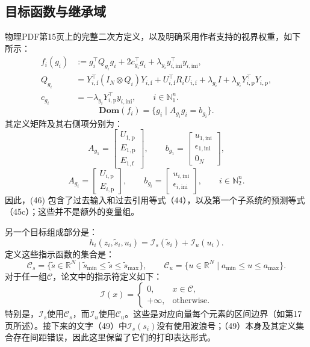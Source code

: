 \documentclass{article}
\begin{document}
\subsection*{目标函数与继承域}
物理PDF第15页上的完整二次方定义，以及明确采用作者支持的视界权重，如下所示：
\begin{align*}
f_i(g_i)&:=g_i^\top Q_{g_i}g_i+2c_{g_i}^\top g_i
 +\lambda_{y_i}y_{i,\mathrm{ini}}^\top y_{i,\mathrm{ini}},\\
Q_{g_i}&=Y_{i,\mathrm f}^\top(I_N\otimes Q_i)Y_{i,\mathrm f}
 +U_{i,\mathrm f}^\top R_iU_{i,\mathrm f}
 +\lambda_{g_i}I+\lambda_{y_i}Y_{i,\mathrm p}^\top Y_{i,\mathrm p},\\
c_{g_i}&=-\lambda_{y_i}Y_{i,\mathrm p}^\top y_{i,\mathrm{ini}},
\qquad i\in\mathbb N_1^n.
\end{align*}
\begin{equation}
\mathbf{Dom}(f_i)=\{g_i\mid A_{g_i}g_i=b_{g_i}\}. \tag{46}
\end{equation}
其定义矩阵及其右侧项分别为：
\[
A_{g_1}=\begin{bmatrix}U_{1,\mathrm p}\\E_{1,\mathrm p}\\E_{1,\mathrm f}\end{bmatrix},
\qquad
b_{g_1}=\begin{bmatrix}u_{1,\mathrm{ini}}\\\epsilon_{1,\mathrm{ini}}\\0_N\end{bmatrix},
\]
\[
A_{g_i}=\begin{bmatrix}U_{i,\mathrm p}\\E_{i,\mathrm p}\end{bmatrix},
\qquad
b_{g_i}=\begin{bmatrix}u_{i,\mathrm{ini}}\\\epsilon_{i,\mathrm{ini}}\end{bmatrix},
\qquad i\in\mathbb N_2^n.
\]
因此，(46) 包含了过去输入和过去引用等式（44），以及第一个子系统的预测等式（45c）；这些并不是额外的变量组。

另一个目标组成部分是：
\begin{equation}
h_i(z_i,\tilde{s}_i,u_i)=\mathcal I_s(\tilde{s}_i)+\mathcal I_u(u_i).
\tag{49}
\end{equation}
定义这些指示函数的集合是：
\[
\mathcal C_s=\{\tilde{s}\in\mathbb R^N\mid
\tilde{s}_{\min}\leq\tilde{s}\leq\tilde{s}_{\max}\},\qquad
\mathcal C_u=\{u\in\mathbb R^N\mid a_{\min}\leq u\leq a_{\max}\}.
\]
对于任一组$\mathcal C$，论文中的指示符定义如下：
\[
\mathcal I(x)=
\begin{cases}
0,&x\in\mathcal C,\\
+\infty,&\text{otherwise}.
\end{cases}
\]
特别是，$\mathcal I_s$使用$\mathcal C_s$，而$\mathcal I_u$使用$\mathcal C_u$。这些是对应向量每个元素的区间边界（如第17页所述）。接下来的文字（49）中$\mathcal I_s(s_i)$没有使用波浪号；（49）本身及其定义集合存在间距错误，因此这里保留了它们的打印表达形式。
\end{document}
